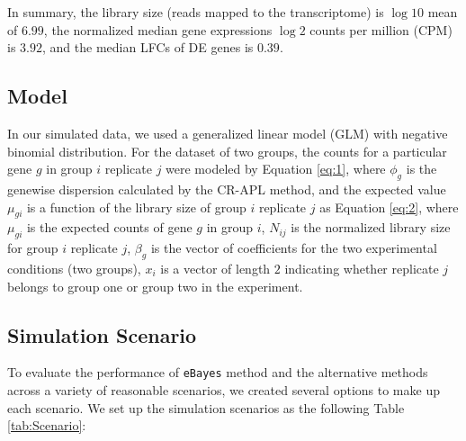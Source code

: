 In summary, the library size (reads mapped to the transcriptome) is $\log{10}$ mean of $6.99$, the normalized median gene expressions $\log{2}$ counts per million (CPM) is $3.92$, and the median LFCs of DE genes is $0.39$. 


\subsection{Model}

In our simulated data, we used a generalized linear model (GLM) with negative binomial distribution. For the dataset of two groups, the counts for a particular gene $g$ in group $i$ replicate $j$ were modeled by Equation \eqref{eq:1}, where $\phi_g$ is the genewise dispersion calculated by the CR-APL method, and the expected value $\mu_{gi}$ is a function of the library size of group $i$ replicate $j$ as Equation \ref{eq:2}, where $\mu_{gi}$ is the expected counts of gene $g$ in group $i$, $N_{ij}$ is the normalized library size for group $i$ replicate $j$, $\beta_g$ is the vector of coefficients for the two experimental conditions (two groups), $x_{i}$ is a vector of length $2$ indicating whether replicate $j$ belongs to group one or group two in the experiment\citep{ching2014power}. 



\subsection{Simulation Scenario}

To evaluate the performance of \texttt{eBayes} method and the alternative methods across a variety of reasonable scenarios, we created several options to make up each scenario. We set up the simulation scenarios as the following Table \ref{tab:Scenario}:

